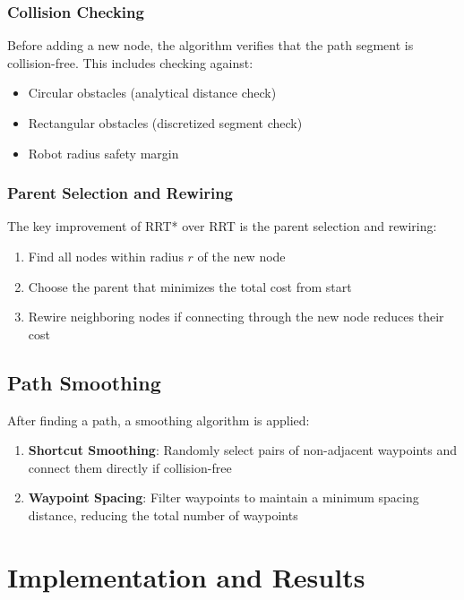 \documentclass[12pt,a4paper]{scrartcl}
\begin{document}
	\subsubsection{Collision Checking}
	Before adding a new node, the algorithm verifies that the path segment is collision-free. This includes checking against:
	\begin{itemize}
		\item Circular obstacles (analytical distance check)
		\item Rectangular obstacles (discretized segment check)
		\item Robot radius safety margin
	\end{itemize}
	
	\subsubsection{Parent Selection and Rewiring}
	The key improvement of RRT* over RRT is the parent selection and rewiring:
	\begin{enumerate}
		\item Find all nodes within radius $r$ of the new node
		\item Choose the parent that minimizes the total cost from start
		\item Rewire neighboring nodes if connecting through the new node reduces their cost
	\end{enumerate}
	
	\subsection{Path Smoothing}
	
	After finding a path, a smoothing algorithm is applied:
	\begin{enumerate}
		\item \textbf{Shortcut Smoothing}: Randomly select pairs of non-adjacent waypoints and connect them directly if collision-free
		\item \textbf{Waypoint Spacing}: Filter waypoints to maintain a minimum spacing distance, reducing the total number of waypoints
	\end{enumerate}
	
	\section{Implementation and Results}
	
\end{document}
